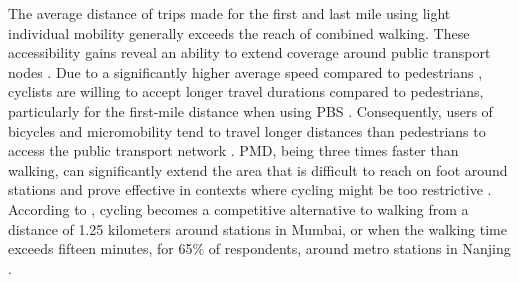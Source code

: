 \begin{refsegment}
The average distance of trips made for the first and last mile using light individual mobility generally exceeds the reach of combined walking. These accessibility gains reveal an ability to extend coverage around public transport nodes \textcolor{blue}{\autocite[4]{advani_bicycle_2006}}. Due to a significantly higher average speed compared to pedestrians \textcolor{blue}{\autocite[42]{lee_strategies_2010}}, cyclists are willing to accept longer travel durations compared to pedestrians, particularly for the first-mile distance when using \acrshort{PBS} \textcolor{blue}{\autocite[114]{bachand-marleau_much-anticipated_2011}}. Consequently, users of bicycles and micromobility tend to travel longer distances than pedestrians to access the public transport network \textcolor{blue}{\autocites[69-70]{flamm_determinants_2013}[832]{ton_understanding_2020}}. \acrshort{PMD}, being three times faster than walking, can significantly extend the area that is difficult to reach on foot around stations and prove effective in contexts where cycling might be too restrictive \textcolor{blue}{\autocite[4]{kostrzewska_towards_2017}}. According to \textcolor{blue}{\textcite[2]{rastogi_willingness_2010}}, cycling becomes a competitive alternative to walking from a distance of 1.25 kilometers around stations in Mumbai, or when the walking time exceeds fifteen minutes, for 65\% of respondents, around metro stations in Nanjing \textcolor{blue}{\autocite[133]{chen_determinants_2012}}.%


\end{refsegment}
